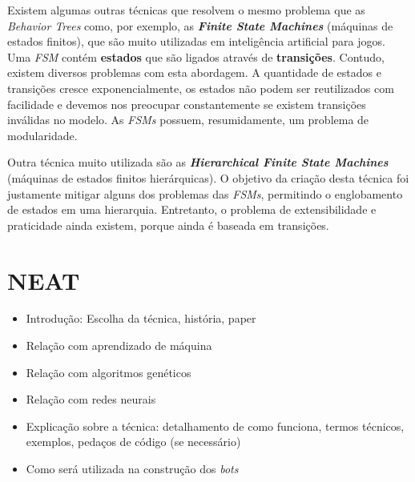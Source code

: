 Existem algumas outras técnicas que resolvem o mesmo problema que as
\textit{Behavior Trees} como, por exemplo, as \textbf{\textit{Finite State
Machines}} (máquinas de estados finitos), que são muito utilizadas em
inteligência artificial para jogos. Uma \textit{FSM} contém \textbf{estados} que
são ligados através de \textbf{transições}. Contudo, existem diversos problemas
com esta abordagem. A quantidade de estados e transições cresce
exponencialmente, os estados não podem ser reutilizados com facilidade e devemos
nos preocupar constantemente se existem transições inválidas no modelo. As
\textit{FSMs} possuem, resumidamente, um problema de modularidade.

Outra técnica muito utilizada são as \textbf{\textit{Hierarchical Finite State
Machines}} (máquinas de estados finitos hierárquicas). O objetivo da criação
desta técnica foi justamente mitigar alguns dos problemas das \textit{FSMs},
permitindo o englobamento de estados em uma hierarquia. Entretanto, o problema
de extensibilidade e praticidade ainda existem, porque ainda é baseada em
transições.


\section{\label{section:neat}NEAT}

\begin{mdframed}[backgroundcolor=green!20]
\begin{itemize}
    \item
        Introdução: Escolha da técnica, história, paper
    \item
        Relação com aprendizado de máquina
    \item
        Relação com algoritmos genéticos
    \item
        Relação com redes neurais
    \item
        Explicação sobre a técnica: detalhamento de como funciona, termos
        técnicos, exemplos, pedaços de código (se necessário)
    \item
        Como será utilizada na construção dos \textit{bots}
\end{itemize}
\end{mdframed}
